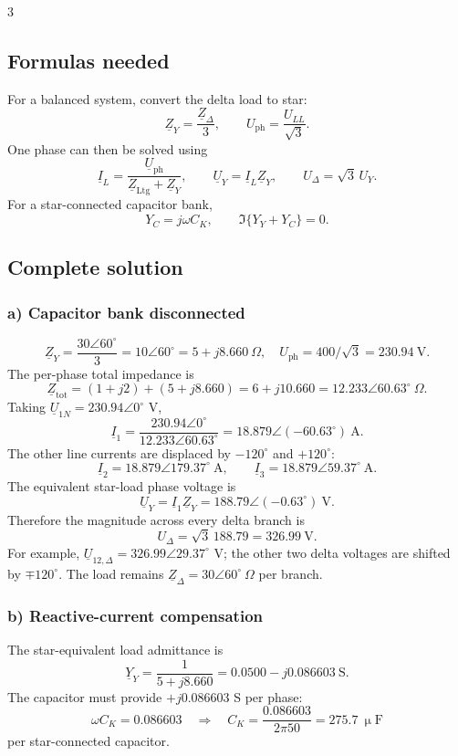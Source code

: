 \documentclass[9pt, landscape, a4paper]{article}
\begin{document}
\begin{multicols*}{3}
\subsection{Formulas needed}
For a balanced system, convert the delta load to star:
\[
 \underline Z_Y=\frac{\underline Z_\Delta}{3},
 \qquad
 U_\mathrm{ph}=\frac{U_{LL}}{\sqrt3}.
\]
One phase can then be solved using
\[
 \underline I_L=\frac{\underline U_\mathrm{ph}}
 {\underline Z_\mathrm{Ltg}+\underline Z_Y},
 \qquad
 \underline U_{Y}=\underline I_L\underline Z_Y,
 \qquad
 U_\Delta=\sqrt3\,U_Y.
\]
For a star-connected capacitor bank,
\[
Y_C=j\omega C_K,\qquad
\Im\{Y_Y+Y_C\}=0.
\]

\subsection{Complete solution}
\subsubsection{a) Capacitor bank disconnected}
\[
\underline Z_Y=\frac{30\angle60^\circ}{3}
=10\angle60^\circ=5+j8.660\ \Omega,
\quad
U_\mathrm{ph}=400/\sqrt3=230.94\ \mathrm V.
\]
The per-phase total impedance is
\[
\underline Z_\mathrm{tot}
=(1+j2)+(5+j8.660)
=6+j10.660
=12.233\angle60.63^\circ\ \Omega.
\]
Taking $\underline U_{1N}=230.94\angle0^\circ$ V,
\[
\underline I_1
=\frac{230.94\angle0^\circ}{12.233\angle60.63^\circ}
=\boxed{18.879\angle(-60.63^\circ)\ \mathrm A}.
\]
The other line currents are displaced by $-120^\circ$ and $+120^\circ$:
\[
\underline I_2=18.879\angle179.37^\circ\ \mathrm A,\qquad
\underline I_3=18.879\angle59.37^\circ\ \mathrm A.
\]
The equivalent star-load phase voltage is
\[
\underline U_Y=\underline I_1\underline Z_Y
=188.79\angle(-0.63^\circ)\ \mathrm V.
\]
Therefore the magnitude across every delta branch is
\[
\boxed{U_\Delta=\sqrt3\,188.79=326.99\ \mathrm V}.
\]
For example,
$\underline U_{12,\Delta}=326.99\angle29.37^\circ$ V; the other two
delta voltages are shifted by $\mp120^\circ$. The load remains
$\boxed{\underline Z_\Delta=30\angle60^\circ\ \Omega}$ per branch.

\subsubsection{b) Reactive-current compensation}
The star-equivalent load admittance is
\[
\underline Y_Y=\frac1{5+j8.660}
=0.0500-j0.086603\ \mathrm S.
\]
The capacitor must provide $+j0.086603$ S per phase:
\[
\omega C_K=0.086603
\quad\Longrightarrow\quad
\boxed{C_K=\frac{0.086603}{2\pi50}
=275.7\ \upmu\mathrm F}
\]
per star-connected capacitor.


\end{multicols*}
\end{document}
